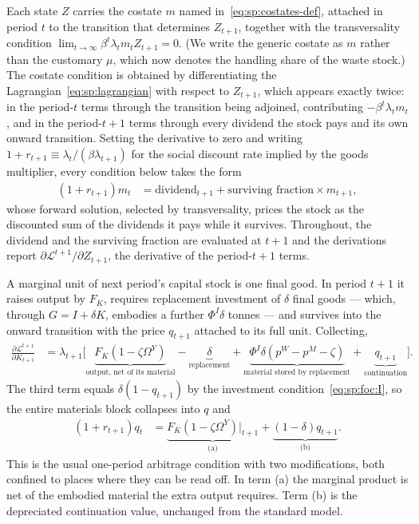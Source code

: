 Each state $Z$ carries the costate $m$ named in~\eqref{eq:sp:costates-def}, attached in period $t$ to the transition that determines $Z_{t+1}$, together with the transversality condition $\lim_{t\to\infty}\beta^t\lambda_t m_t Z_{t+1}=0$. (We write the generic costate as $m$ rather than the customary $\mu$, which now denotes the handling share of the waste stock.) The costate condition is obtained by differentiating the Lagrangian~\eqref{eq:sp:lagrangian} with respect to $Z_{t+1}$, which appears exactly twice: in the period-$t$ terms through the transition being adjoined, contributing $-\beta^t\lambda_tm_t$, and in the period-$t{+}1$ terms through every dividend the stock pays and its own onward transition. Setting the derivative to zero and writing $1+r_{t+1}\equiv\lambda_t/\left(\beta\lambda_{t+1}\right)$ for the social discount rate implied by the goods multiplier, every condition below takes the form
\begin{align*}
\left(1+r_{t+1}\right)m_t &= \text{dividend}_{t+1}+\text{surviving fraction}\times m_{t+1},
\end{align*}
whose forward solution, selected by transversality, prices the stock as the discounted sum of the dividends it pays while it survives. Throughout, the dividend and the surviving fraction are evaluated at $t+1$ and the derivations report $\partial\mathcal L^{t+1}/\partial Z_{t+1}$, the derivative of the period-$t{+}1$ terms.

 A marginal unit of next period's capital stock is one final good. In period $t+1$ it raises output by $F_K$, requires replacement investment of $\delta$ final goods --- which, through $G=I+\delta K$, embodies a further $\Phi^I\delta$ tonnes --- and survives into the onward transition with the price $q_{t+1}$ attached to its full unit. Collecting,
\begin{align*}
\frac{\partial\mathcal L^{t+1}}{\partial K_{t+1}} &= \lambda_{t+1}\Big[\underbrace{F_K\left(1-\zeta\Omega^Y\right)}_{\text{output, net of its material}}-\underbrace{\delta}_{\text{replacement}}+\underbrace{\Phi^I\delta\left(p^W-p^M-\zeta\right)}_{\text{material stored by replacement}}+\underbrace{q_{t+1}}_{\text{continuation}}\Big].
\end{align*}
The third term equals $\delta\left(1-q_{t+1}\right)$ by the investment condition~\eqref{eq:sp:foc:I}, so the entire materials block collapses into $q$ and
\begin{align}
\left(1+r_{t+1}\right)q_t &= \underbrace{F_K\left(1-\zeta\Omega^Y\right)\Big|_{t+1}}_{\text{(a)}}+\underbrace{\left(1-\delta\right)q_{t+1}}_{\text{(b)}} .
\label{eq:sp:costate:K}
\end{align}
This is the usual one-period arbitrage condition with two modifications, both confined to places where they can be read off. In term (a) the marginal product is net of the embodied material the extra output requires. Term (b) is the depreciated continuation value, unchanged from the standard model.

